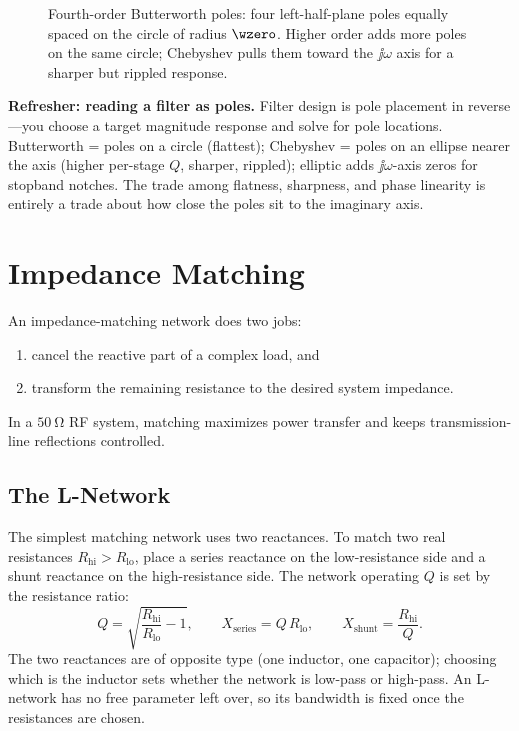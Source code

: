 \begin{figure}[htbp]
\centering
{}
\caption{Fourth-order Butterworth poles: four left-half-plane poles equally
spaced on the circle of radius \(\wzero\). Higher order adds more poles on the
same circle; Chebyshev pulls them toward the \(\jj\omega\) axis for a sharper but
rippled response.}
\label{fig:butterworth-poles}
\end{figure}

\begin{controlsbox}
\textbf{Refresher: reading a filter as poles.} Filter design is pole placement in
reverse---you choose a target magnitude response and solve for pole locations.
Butterworth = poles on a circle (flattest); Chebyshev = poles on an ellipse
nearer the axis (higher per-stage \(Q\), sharper, rippled); elliptic adds
\(\jj\omega\)-axis zeros for stopband notches. The trade among flatness,
sharpness, and phase linearity is entirely a trade about how close the poles sit
to the imaginary axis.
\end{controlsbox}

\section{Impedance Matching}
An impedance-matching network does two jobs:
\begin{enumerate}
\item cancel the reactive part of a complex load, and
\item transform the remaining resistance to the desired system impedance.
\end{enumerate}
In a \(\SI{50}{\ohm}\) RF system, matching maximizes power transfer and keeps
transmission-line reflections controlled.

\subsection{The L-Network}
The simplest matching network uses two reactances. To match two real resistances
\(R_{\text{hi}}>R_{\text{lo}}\), place a series reactance on the low-resistance
side and a shunt reactance on the high-resistance side. The network operating
\(Q\) is set by the resistance ratio:
\[
Q=\sqrt{\frac{R_{\text{hi}}}{R_{\text{lo}}}-1},
\qquad
X_{\text{series}}=Q\,R_{\text{lo}},
\qquad
X_{\text{shunt}}=\frac{R_{\text{hi}}}{Q}.
\]
The two reactances are of opposite type (one inductor, one capacitor); choosing
which is the inductor sets whether the network is low-pass or high-pass. An
L-network has no free parameter left over, so its bandwidth is fixed once the
resistances are chosen.

